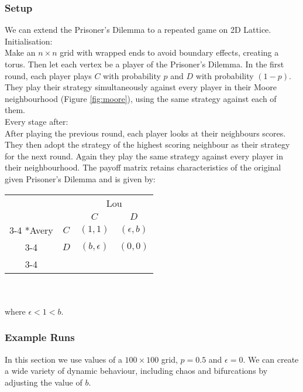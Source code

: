 \subsubsection{Setup}
We can extend the Prisoner's Dilemma to a repeated game on  2D Lattice.\\
Initialisation:\\
Make an $n \times n$ grid with wrapped ends to avoid boundary effects, creating a torus. Then let each vertex be a player of the Prisoner's Dilemma. In the first round, each player plays $C$ with probability $p$ and $D$ with probability $(1-p)$. They play their strategy simultaneously against every player in their Moore neighbourhood (Figure \ref{fig:moore}), using the same strategy against each of them.\\
Every stage after:\\
After playing the previous round, each player looks at their neighbours scores. They then adopt the strategy of the highest scoring neighbour as their strategy for the next round. Again they play the same strategy against every player in their neighbourhood.
The payoff matrix retains characteristics of the original given Prisoner's Dilemma and is given by:\\
\setlength{\extrarowheight}{2pt}
\begin{tabular}{cc|c|c|}
	& \multicolumn{1}{c}{} & \multicolumn{2}{c}{Lou}\\
	& \multicolumn{1}{c}{} & \multicolumn{1}{c}{$C$}  & \multicolumn{1}{c}{$D$} \\\cline{3-4}
	\multirow{2}*{Avery}  & $C$ & $(1,1)$ & $(\epsilon,b)$ \\\cline{3-4}
	& $D$ & $(b,\epsilon)$ & $(0,0)$ \\\cline{3-4}
\end{tabular}
\\
\\
where $\epsilon<1<b$.
\\

\subsubsection{Example Runs}
In this section we use values of a $100\times100$ grid, $p=0.5$ and $\epsilon=0$. We can create a wide variety of dynamic behaviour, including chaos and bifurcations by adjusting the value of $b$.

